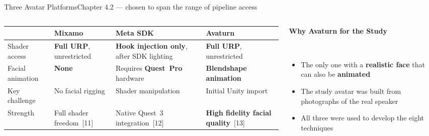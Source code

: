 \documentclass[aspectratio=169,10pt]{beamer}
\newcommand{\hl}[1]{{\color{knblue}\textbf{#1}}}
\newcommand{\good}[1]{{\color{kngreen}\textbf{#1}}}
\newcommand{\bad}[1]{{\color{knred}\textbf{#1}}}
\newcommand{\panelhead}[1]{\noindent\colorbox{kncyan}{\parbox{0.96\textwidth}{\centering\vspace{1pt}\color{white}\scriptsize\bfseries #1\vspace{1pt}}}\\[0.25em]}
\newcommand{\panel}[1]{\noindent\colorbox{knlight}{\parbox{0.96\textwidth}{\vspace{2pt}\scriptsize
\begin{itemize}\setlength{\itemsep}{0.2em}\setlength{\leftmargini}{1.1em}#1\end{itemize}\vspace{2pt}}}}
\newcommand{\rowrule}{\noalign{\vskip1pt}\arrayrulecolor{black!12}\hline\arrayrulecolor{black}\noalign{\vskip1pt}}
\begin{document}
\begin{frame}{Three Avatar Platforms}{Chapter 4.2 — chosen to span the range of pipeline access}
  \vspace{0.3em}
  \begin{columns}[T]
    \begin{column}{0.63\textwidth}
      \scriptsize
      \setlength{\tabcolsep}{4pt}\renewcommand{\arraystretch}{1.45}
      \begin{tabular}{@{}>{\raggedright\arraybackslash}m{}>{\raggedright\arraybackslash}m{}>{\raggedright\arraybackslash}m{}>{\raggedright\arraybackslash}m{}@{}}
        \toprule
        & \textbf{Mixamo} & \textbf{Meta SDK} & \textbf{Avaturn} \\
        \midrule
        Shader access    & \good{Full URP}, unrestricted & \bad{Hook injection only}, after SDK lighting & \good{Full URP}, unrestricted \\
        \rowrule
        Facial animation & \bad{None} & Requires \hl{Quest~Pro} hardware & \good{Blendshape animation} \\
        \rowrule
        Key challenge    & No facial rigging & Shader manipulation & Initial Unity import \\
        \rowrule
        Strength         & Full shader freedom~[11] & Native Quest~3 integration~[12] & \hl{High fidelity facial quality}~[13] \\
        \bottomrule
      \end{tabular}
    \end{column}
    \begin{column}{0.34\textwidth}
      \panelhead{Why Avaturn for the Study}
      \panel{%
        \item The only one with a \hl{realistic face} that can also be \hl{animated}
        \item The study avatar was built from photographs of the real speaker
        \item All three were used to develop the eight techniques}
    \end{column}
  \end{columns}
\end{frame}
\end{document}
